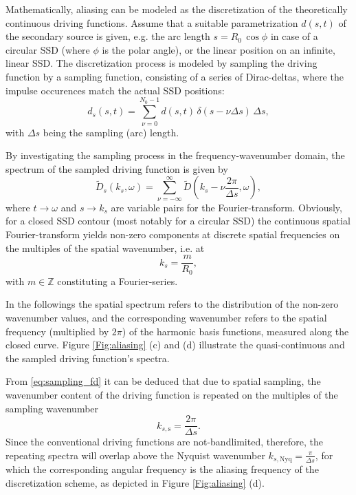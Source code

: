 \documentclass[conference]{IEEEtran}
\begin{document}
Mathematically, aliasing can be modeled as the discretization of the theoretically continuous driving functions.
Assume that a suitable parametrization $d(s,t)$ of the secondary source is given, e.g. the arc length $s = R_0\, \cos \phi$ in case of a circular SSD (where $\phi$ is the polar angle), or the linear position on an infinite, linear SSD.
The discretization process is modeled by sampling the driving function by a sampling function, consisting of a series of Dirac-deltas, where the impulse occurences match the actual SSD positions:
\begin{equation}
    d_s(s,t) = \sum_{\nu = 0}^{N_0-1} d(s,t) \, \delta(s - \nu \Delta s) \, \Delta s,
    \label{eq:sampling_td}
\end{equation}
with $\Delta s$ being the sampling (arc) length.

By investigating the sampling process in the frequency-wavenumber domain, the spectrum of the sampled driving function is given by
\begin{equation}
    \tilde{D}_s(k_s,\omega) = \sum_{\nu = -\infty}^{\infty} \tilde{D}\left(k_s- \nu \frac{2\pi}{\Delta s},\omega\right),
    \label{eq:sampling_fd}
\end{equation}
where $t \rightarrow \omega$ and $s \rightarrow k_s$ are variable pairs for the Fourier-transform.
Obviously, for a closed SSD contour (most notably for a circular SSD) the continuous spatial Fourier-transform yields non-zero components at discrete spatial frequencies on the multiples of the spatial wavenumber, i.e. at
\begin{equation}
    k_s = \frac{m}{R_0},
\end{equation}
with $m \in \mathbb{Z}$ constituting a Fourier-series.

In the followings the spatial spectrum refers to the distribution of the non-zero wavenumber values, and the corresponding wavenumber refers to the spatial frequency (multiplied by $2\pi$) of the harmonic basis functions, measured along the closed curve.
Figure \ref{Fig:aliasing} (c) and (d) illustrate the quasi-continuous and the sampled driving function's spectra.

From \eqref{eq:sampling_fd} it can be deduced that due to spatial sampling, the wavenumber content of the driving function is repeated on the multiples of the sampling wavenumber
\begin{equation}
k_{s, \mathrm{s}} = \frac{2\pi}{\Delta s}.
\end{equation}
Since the conventional driving functions are not-bandlimited, therefore, the repeating spectra will overlap above the Nyquist wavenumber $k_{s, \mathrm{Nyq}} = \frac{\pi}{\Delta s}$, for which the corresponding angular frequency is the aliasing frequency of the discretization scheme, as depicted in Figure \ref{Fig:aliasing} (d).
\end{document}

